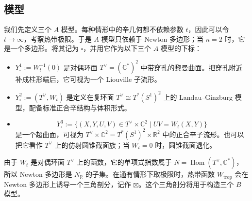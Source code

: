 \subsection{模型}\label{subsec:one-two-three-models}
我们先定义三个 $A$ 模型。每种情形中的辛几何都不依赖参数 $t$，因此可以令 $t\to\infty$，考察热带极限。于是 $A$ 模型只依赖于 Newton 多边形；当 $n=2$ 时，它是一个多边形。将其记为 $\square$，并用它作为以下三个 $A$ 模型的下标：
\begin{itemize}
  \item[(1D)] $Y^1_\square:=W_t^{-1}(0)$ 是对偶环面 $T^\vee=(\mathbb C^*)^2$ 中带穿孔的黎曼曲面。把穿孔附近补成柱形端后，它可视为一个 Liouville 子流形。
  \item[(2D)] $Y^2_\square:=(T^\vee,W_t)$ 是定义在复环面 $T^\vee\cong T^*(S^1)^2$ 上的 Landau--Ginzburg 模型，配备标准正合辛结构与体积形式。
  \item[(3D)]
  \[
    Y^3_\square:=\{(X,Y,U,V)\in T^\vee\times\mathbb C^2\mid
      UV=W_t(X,Y)\}
  \]
  是一个超曲面，可视为 $T^\vee\times\mathbb C^2=T^*(S^1)^2\times\mathbb R^2$ 中的正合辛子流形。也可以把它看作 $T^\vee$ 上的仿射圆锥截面族；当 $W_t=0$ 时，圆锥截面退化。
\end{itemize}

由于 $W_t$ 是对偶环面 $T^\vee$ 上的函数，它的单项式指数属于 $N=\operatorname{Hom}(T^\vee,\mathbb C^*)$，所以 Newton 多边形是 $N_{\mathbb R}$ 的子集。在通有情形下取极限时，热带函数 $W_{\mathrm{trop}}$ 会在 Newton 多边形上诱导一个三角剖分，记作 $\boxtimes$。这个三角剖分将用于构造三个 $B$ 模型。


